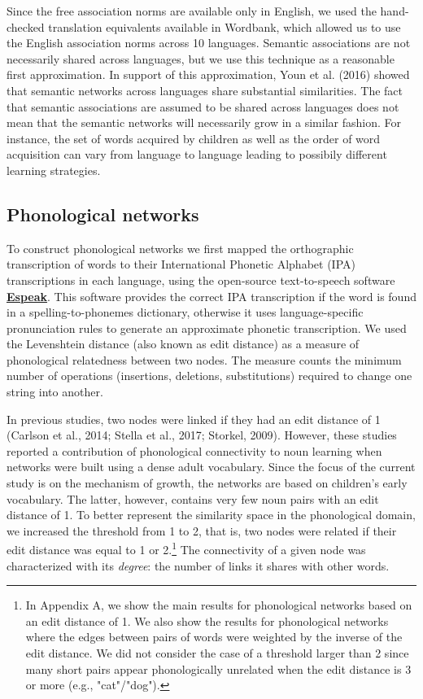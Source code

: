 \documentclass[english,floatsintext,man]{apa6}
\theoremstyle{definition}
\theoremstyle{definition}
\theoremstyle{definition}
\theoremstyle{remark}
\begin{document}
Since the free association norms are available only in English, we used
the hand-checked translation equivalents available in Wordbank, which
allowed us to use the English association norms across 10 languages.
Semantic associations are not necessarily shared across languages, but
we use this technique as a reasonable first approximation. In support of
this approximation, Youn et al. (2016) showed that semantic networks
across languages share substantial similarities. The fact that semantic
associations are assumed to be shared across languages does not mean
that the semantic networks will necessarily grow in a similar fashion.
For instance, the set of words acquired by children as well as the order
of word acquisition can vary from language to language leading to
possibily different learning strategies.

\subsection{Phonological networks}\label{phonological-networks}

To construct phonological networks we first mapped the orthographic
transcription of words to their International Phonetic Alphabet (IPA)
transcriptions in each language, using the open-source text-to-speech
software \textbf{\href{http://http://espeak.sourceforge.net/}{Espeak}}.
This software provides the correct IPA transcription if the word is
found in a spelling-to-phonemes dictionary, otherwise it uses
language-specific pronunciation rules to generate an approximate
phonetic transcription. We used the Levenshtein distance (also known as
edit distance) as a measure of phonological relatedness between two
nodes. The measure counts the minimum number of operations (insertions,
deletions, substitutions) required to change one string into another.

In previous studies, two nodes were linked if they had an edit distance
of 1 (Carlson et al., 2014; Stella et al., 2017; Storkel, 2009).
However, these studies reported a contribution of phonological
connectivity to noun learning when networks were built using a dense
adult vocabulary. Since the focus of the current study is on the
mechanism of growth, the networks are based on children's early
vocabulary. The latter, however, contains very few noun pairs with an
edit distance of 1. To better represent the similarity space in the
phonological domain, we increased the threshold from 1 to 2, that is,
two nodes were related if their edit distance was equal to 1 or
2.\footnote{In Appendix A, we show the main results for phonological networks based on an edit distance of 1. We also show the results for phonological networks where the edges between pairs of words were weighted by the inverse of the edit distance. We did not consider the case of a threshold larger than 2 since many short pairs appear phonologically unrelated when the edit distance is 3 or more (e.g., "cat"/"dog").}
The connectivity of a given node was characterized with its
\emph{degree}: the number of links it shares with other words.
\end{document}
